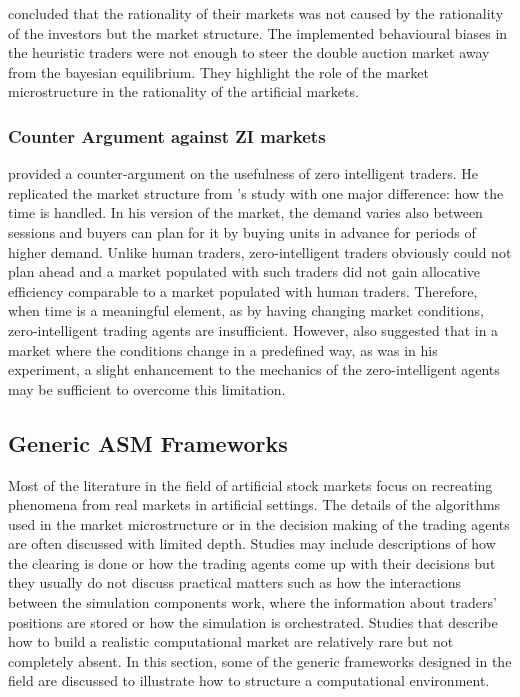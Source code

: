 \citeauthor{Jam96} concluded that the rationality of their markets was
not caused by the rationality of the investors but the market structure.
The implemented behavioural biases in the heuristic traders were not enough 
to steer the double auction market away from the bayesian equilibrium.
They highlight the role of the market microstructure in the rationality 
of the artificial markets. 


\subsubsection{Counter Argument against ZI markets}
\citet{Mil08} provided a counter-argument on the usefulness of zero
intelligent traders. He replicated the market structure from
\citeauthor{God93}'s study with one major difference: how the 
time is handled. In his version of the market, the demand varies
also between sessions and buyers can plan for it by buying units
in advance for periods of higher demand. Unlike human traders,
zero-intelligent traders obviously could not plan ahead and a market
populated with such traders did not gain allocative efficiency comparable
to a market populated with human traders. Therefore, when time is a 
meaningful element, as by having changing market conditions, zero-intelligent 
trading agents are insufficient. However, \citeauthor{Mil08} also suggested
that in a market where the conditions change in a predefined way, as was in 
his experiment, a slight enhancement to the mechanics of the zero-intelligent 
agents may be sufficient to overcome this limitation.



\subsection{Generic ASM Frameworks}

Most of the literature in the field of artificial stock markets 
focus on recreating phenomena from real markets in artificial settings.
The details of the algorithms used in the market microstructure or in
the decision making of the trading agents are often discussed with limited 
depth. Studies may include descriptions of how the clearing is done or how the trading agents 
come up with their decisions but they usually do not discuss practical matters 
such as how the interactions between the simulation components work, where the 
information about traders' positions are stored or how the simulation is orchestrated. 
Studies that describe how to build a realistic computational 
market are relatively rare but not completely absent. In this section, some of the 
generic frameworks designed in the field are discussed to illustrate how 
to structure a computational environment.


